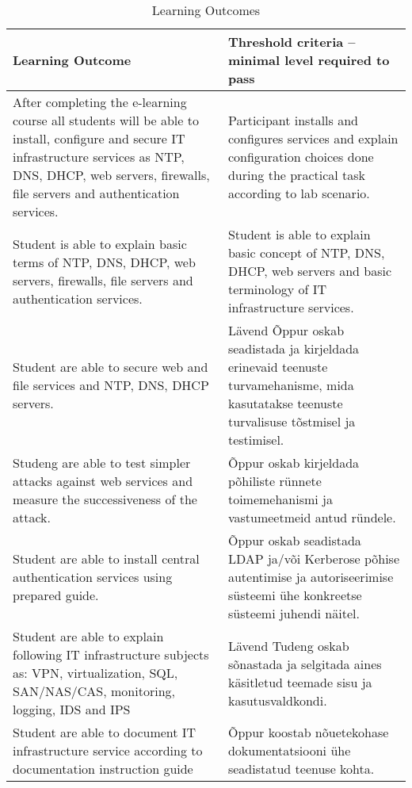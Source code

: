 \begin{table}[h]
\centering
\caption{Learning Outcomes}
{ \small
\begin{tabular}{|p{7cm}|p{7cm}|}

\hline 
\color{blue} Learning Outcome &\color{blue}  Threshold criteria -- minimal level required to pass \\ 
\hline 

\hline 
After completing the e-learning course all students will be able to install, configure and secure  IT infrastructure services as \gls{NTP}, \gls{DNS}, \gls{DHCP}, web servers, firewalls, file servers and authentication services. & Participant installs and configures services and explain configuration choices done during the practical task according to lab scenario.\\ 
\hline 
Student is able to explain basic terms of \gls{NTP}, \gls{DNS}, \gls{DHCP}, web servers, firewalls, file servers and authentication services. 
& 

Student is able to explain basic concept of \gls{NTP}, \gls{DNS}, \gls{DHCP}, web servers and  basic terminology of IT infrastructure services.
\\ 
\hline 
Student are able to secure web and file services and \gls{NTP}, \gls{DNS}, \gls{DHCP} servers.

& Lävend Õppur oskab seadistada ja kirjeldada erinevaid teenuste
        turvamehanisme, mida kasutatakse teenuste turvalisuse
       tõstmisel ja testimisel. \\ 
\hline 
Studeng are able to test simpler attacks against web services and measure the successiveness of the attack.

& Õppur oskab kirjeldada põhiliste rünnete toimemehanismi ja
vastumeetmeid antud ründele. \\ 
\hline 
Student are able to install central authentication services using prepared guide.
& 
Õppur oskab seadistada LDAP ja/või Kerberose põhise autentimise
ja autoriseerimise süsteemi ühe konkreetse süsteemi juhendi
näitel. 
\\ 
\hline 
Student are able to explain following IT infrastructure subjects as: VPN, virtualization, SQL, SAN/NAS/CAS, monitoring, logging, IDS and IPS
& 
Lävend
Tudeng oskab sõnastada ja selgitada aines käsitletud teemade
sisu ja kasutusvaldkondi. \\ 

\hline 
Student are able to document IT infrastructure service according to documentation instruction guide

& 

Õppur koostab nõuetekohase dokumentatsiooni ühe seadistatud
teenuse kohta. 
\\ 
\hline 

\end{tabular} 
}
\label{tab:learning_outcomes}
\end{table}

